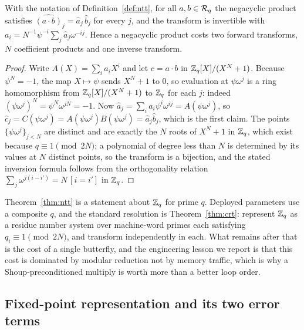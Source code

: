 \begin{theorem}
\label{thm:ntt}
With the notation of Definition~\ref{def:ntt}, for all $a,b \in \mathcal{R}_q$ the
negacyclic product satisfies
$\widehat{(a\cdot b)}_j = \widehat{a}_j\,\widehat{b}_j$ for every $j$, and the
transform is invertible with
$a_i = N^{-1}\psi^{-i}\sum_j \widehat{a}_j \omega^{-ij}$.
Hence a negacyclic product costs two forward transforms, $N$ coefficient
products and one inverse transform.
\end{theorem}

\begin{proof}
Write $A(X) = \sum_i a_i X^i$ and let $c = a\cdot b$ in
$\mathbb{Z}_q[X]/(X^N+1)$. Because $\psi^N = -1$, the map $X \mapsto \psi$ sends
$X^N+1$ to $0$, so evaluation at $\psi\omega^{j}$ is a ring homomorphism from
$\mathbb{Z}_q[X]/(X^N+1)$ to $\mathbb{Z}_q$ for each $j$: indeed
$(\psi\omega^j)^N = \psi^N \omega^{jN} = -1$. Now
$\widehat{a}_j = \sum_i a_i \psi^i \omega^{ij} = A(\psi\omega^{j})$, so
$\widehat{c}_j = C(\psi\omega^j) = A(\psi\omega^j)B(\psi\omega^j) =
\widehat{a}_j\widehat{b}_j$, which is the first claim. The points
$\{\psi\omega^j\}_{j<N}$ are distinct and are exactly the $N$ roots of $X^N+1$ in
$\mathbb{Z}_q$, which exist because $q \equiv 1 \pmod {2N}$; a polynomial of degree less
than $N$ is determined by its values at $N$ distinct points, so the transform is
a bijection, and the stated inversion formula follows from the orthogonality
relation $\sum_{j} \omega^{j(i-i')} = N\,[i = i']$ in $\mathbb{Z}_q$.
\end{proof}

\begin{remark}
\label{rem:ntt-eng}
Theorem~\ref{thm:ntt} is a statement about $\mathbb{Z}_q$ for prime $q$. Deployed
parameters use a composite $q$, and the standard resolution is
Theorem~\ref{thm:crt}: represent $\mathbb{Z}_q$ as a residue number system over
machine-word primes each satisfying $q_i \equiv 1 \pmod{2N}$, and transform
independently in each. What remains after that is the cost of a single butterfly,
and the engineering lesson we report is that this cost is dominated by modular
reduction not by memory traffic, which is why a Shoup-preconditioned
multiply is worth more than a better loop order.
\end{remark}

\subsection{Fixed-point representation and its two error terms}
\label{sec:math:fixed}

